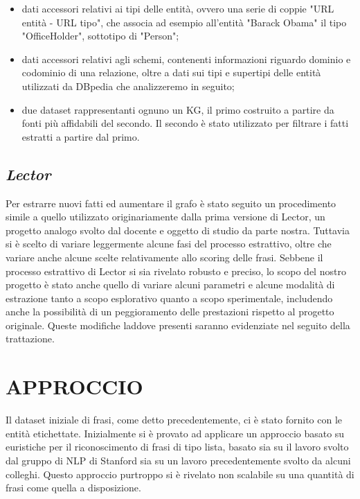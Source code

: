 \documentclass[10pt,a4paper,twocolumn]{article}
\begin{document}
\begin{itemize}
\item dati accessori relativi ai tipi delle entità, ovvero una serie di coppie "URL entità - URL tipo", che associa ad esempio all'entità "Barack Obama" il tipo "OfficeHolder", sottotipo di "Person";

\item dati accessori relativi agli schemi, contenenti informazioni riguardo dominio e codominio di una relazione, oltre a dati sui tipi e supertipi delle entità utilizzati da DBpedia che analizzeremo in seguito;

\item due dataset rappresentanti ognuno un KG, il primo costruito a partire da fonti più affidabili del secondo. Il secondo è stato utilizzato per filtrare i fatti estratti a partire dal primo.
\end{itemize}

\subsection*{\textit{Lector}}

Per estrarre nuovi fatti ed aumentare il grafo è stato seguito un procedimento simile a quello utilizzato originariamente dalla prima versione di Lector, un progetto analogo svolto dal docente e oggetto di studio da parte nostra. Tuttavia si è scelto di variare leggermente alcune fasi del processo estrattivo, oltre che variare anche alcune scelte relativamente allo scoring delle frasi. 
Sebbene il processo estrattivo di Lector si sia rivelato robusto e preciso, lo scopo del nostro progetto è stato anche quello di variare alcuni parametri e alcune modalità di estrazione tanto a scopo esplorativo quanto a scopo sperimentale, includendo anche la possibilità di un peggioramento delle prestazioni rispetto al progetto originale.
Queste modifiche laddove presenti saranno evidenziate nel seguito della trattazione.

\section{APPROCCIO}

Il dataset iniziale di frasi, come detto precedentemente, ci è stato fornito con le entità etichettate. Inizialmente si è provato ad applicare un approccio basato su euristiche per il riconoscimento di frasi di tipo lista, basato sia su il lavoro svolto dal gruppo di NLP di Stanford sia su un lavoro precedentemente svolto da alcuni colleghi. Questo approccio purtroppo si è rivelato non scalabile su una quantità di frasi come quella a disposizione. 
\end{document}
